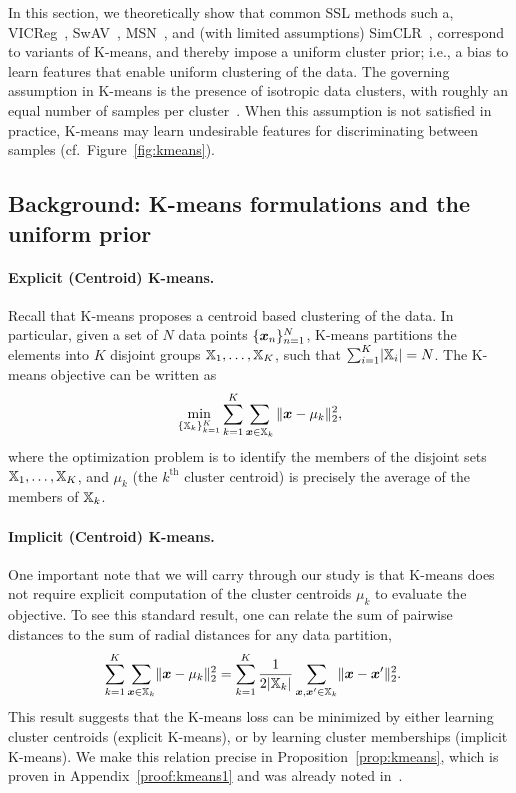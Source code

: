 \documentclass{article} %
\begin{document}
In this section, we theoretically show that common SSL methods such a, VICReg~\citep{bardes2021vicreg}, SwAV~\citep{caron2020unsupervised}, MSN~\citep{assran2022masked}, and (with limited assumptions) SimCLR~\citep{chen2020simple}, correspond to variants of K-means, and thereby impose a uniform cluster prior; i.e., a bias to learn features that enable uniform clustering of the data.
The governing assumption in K-means is the presence of isotropic data clusters, with roughly an equal number of samples per cluster~\citep{wu2009adapting,liang2012k}.
When this assumption is not satisfied in practice, K-means may learn undesirable features for discriminating between samples (cf.~Figure~\ref{fig:kmeans}).

\subsection{Background: K-means formulations and the uniform prior}

\paragraph{Explicit (Centroid) K-means.} 
Recall that K-means proposes a centroid based clustering of the data.
In particular, given a set of $N$ data points $\{{\bm{x}}_n\}^N_{n=1}$, K-means partitions the elements into $K$ disjoint groups ${\mathbb{X}}_1,\dots,{\mathbb{X}}_K$, such that $\sum^K_{i=1}\lvert{\mathbb{X}}_i\rvert = N$.
The K-means objective can be written as
\begin{equation}
\label{eq:kmeans}
    \min_{\{{\mathbb{X}}_k\}_{k=1}^K}
    \sum_{k=1}^K \sum_{{\bm{x}} \in {\mathbb{X}}_k} \|{\bm{x}}-\mu_k\|^2_2,
\end{equation}
where the optimization problem is to identify the members of the disjoint sets ${\mathbb{X}}_1, \ldots, {\mathbb{X}}_K$, and $\mu_k$ (the $k^\text{th}$ cluster centroid) is precisely the average of the members of ${\mathbb{X}}_k$.

\paragraph{Implicit (Centroid) K-means.}
One important note that we will carry through our study is that K-means does not require explicit computation of the cluster centroids $\mu_k$ to evaluate the objective.
To see this standard result, one can relate the sum of pairwise distances to the sum of radial distances for any data partition,
\begin{align} 
    \sum_{k=1}^K \sum_{{\bm{x}} \in{\mathbb{X}}_k} \lVert{\bm{x}}-\mu_k\rVert^2_2 & = \sum_{k=1}^K \frac{1}{2\lvert{\mathbb{X}}_k\rvert} \sum_{{\bm{x}}, {\bm{x}}^\prime \in {\mathbb{X}}_k} \lVert{\bm{x}}-{\bm{x}}'\rVert^2_2. \label{eq2}
\end{align}
This result suggests that the K-means loss can be minimized by either learning cluster centroids (explicit K-means), or by learning cluster memberships (implicit K-means). 
We make this relation precise in Proposition~\ref{prop:kmeans}, which is proven in Appendix~\ref{proof:kmeans1} and was already noted in~\citet{zha2001spectral,awasthi2015relax}.
\end{document}
